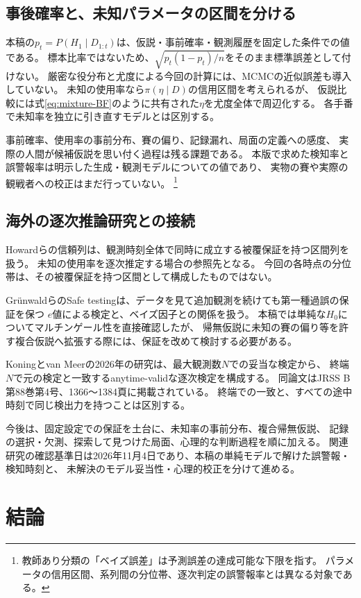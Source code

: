 \documentclass[11pt,a4paper]{article}
\numberwithin{equation}{section}
\begin{document}
\subsection{事後確率と、未知パラメータの区間を分ける}
本稿の$p_t=P(H_1\mid D_{1:t})$は、仮説・事前確率・観測履歴を固定した条件での値である。
標本比率ではないため、$\sqrt{p_t(1-p_t)/n}$をそのまま標準誤差として付けない。
厳密な役分布と尤度による今回の計算には、MCMCの近似誤差も導入していない。
未知の使用率なら$\pi(\eta\mid D)$の信用区間を考えられるが、
仮説比較には式\eqref{eq:mixture-BF}のように共有された$\eta$を尤度全体で周辺化する。
各手番で未知率を独立に引き直すモデルとは区別する。

事前確率、使用率の事前分布、賽の偏り、記録漏れ、局面の定義への感度、
実際の人間が候補仮説を思い付く過程は残る課題である。
本版で求めた検知率と誤警報率は明示した生成・観測モデルについての値であり、
実物の賽や実際の観戦者への校正はまだ行っていない。
\footnote{教師あり分類の「ベイズ誤差」は予測誤差の達成可能な下限を指す\cite{ishida}。
パラメータの信用区間、系列間の分位帯、逐次判定の誤警報率とは異なる対象である。}

\subsection{海外の逐次推論研究との接続}
Howardらの信頼列は、観測時刻全体で同時に成立する被覆保証を持つ区間列を扱う\cite{howard2021}。
未知の使用率を逐次推定する場合の参照先となる。
今回の各時点の分位帯は、その被覆保証を持つ区間として構成したものではない。

Gr\"unwaldらのSafe testingは、データを見て追加観測を続けても第一種過誤の保証を保つ
$e$値による検定と、ベイズ因子との関係を扱う\cite{grunwald2024}。
本稿では単純な$H_0$についてマルチンゲール性を直接確認したが、
帰無仮説に未知の賽の偏り等を許す複合仮説へ拡張する際には、保証を改めて検討する必要がある。

Koningとvan Meerの2026年の研究は、最大観測数$N$での妥当な検定から、
終端$N$で元の検定と一致するanytime-validな逐次検定を構成する\cite{koning2026}。
同論文はJRSS B第88巻第4号、1366〜1384頁に掲載されている。
終端での一致と、すべての途中時刻で同じ検出力を持つことは区別する。

今後は、固定設定での保証を土台に、未知率の事前分布、複合帰無仮説、
記録の選択・欠測、探索して見つけた局面、心理的な判断過程を順に加える。
関連研究の確認基準日は2026年11月4日であり、本稿の単純モデルで解けた誤警報・検知時刻と、
未解決のモデル妥当性・心理的校正を分けて進める。


\clearpage
\section{結論}
\end{document}

